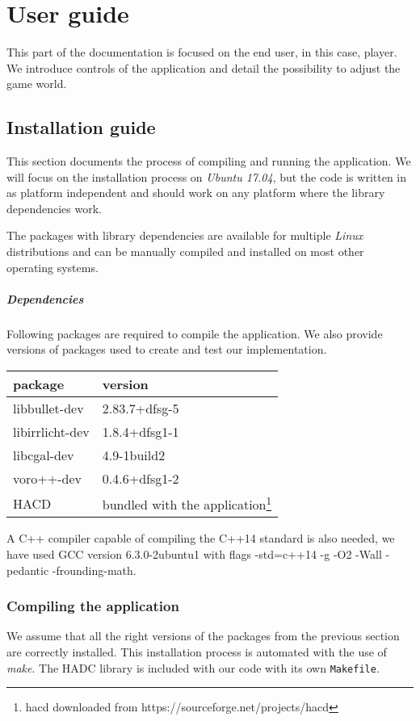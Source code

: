 \chapter{User guide}
This part of the documentation is focused on the end user, in this case, player. We introduce controls of the application and detail the possibility to adjust the game world.

\section{Installation guide}

This section documents the process of compiling and running the application. We will focus on the installation process on \emph{Ubuntu 17.04}, but the code is written in as platform independent and should work on any platform where the library dependencies work.

The packages with library dependencies are available for multiple \emph{Linux}
distributions and can be manually compiled and installed on most other
operating systems.

\paragraph{Dependencies}
Following packages are required to compile the application. We also provide versions of packages used to create and test our implementation.
\begin{center}
\begin{tabular}{ll}
package & version \\
\hline
libbullet-dev & 2.83.7+dfsg-5 \\
libirrlicht-dev & 1.8.4+dfsg1-1 \\
libcgal-dev & 4.9-1build2 \\
voro++-dev & 0.4.6+dfsg1-2 \\
HACD & bundled with the application\footnote{hacd downloaded from https://sourceforge.net/projects/hacd}
\end{tabular}
\end{center}

A C++ compiler capable of compiling the C++14 standard is also needed, we have used GCC version 6.3.0-2ubuntu1 with flags -std=c++14 -g -O2 -Wall -pedantic -frounding-math.

\subsection*{Compiling the application}
We assume that all the right versions of the packages from the previous section are correctly installed. This installation process is automated with the use of \emph{make}. The HADC library is included with our code with its own {\tt Makefile}.

